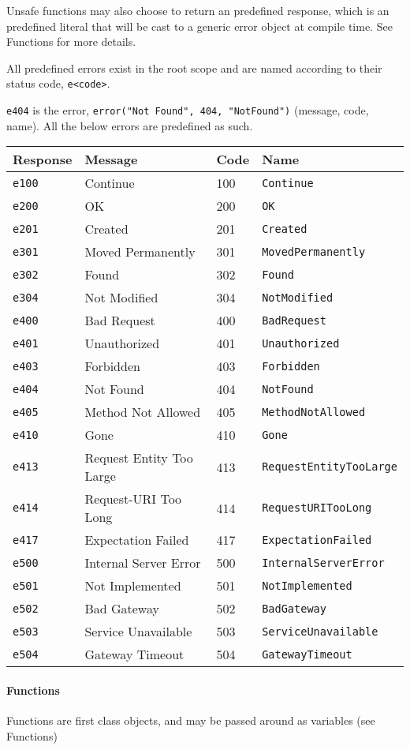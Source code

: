 Unsafe functions may also choose to return an predefined response, which
is an predefined literal that will be cast to a generic error object at
compile time. See Functions for more details.

All predefined errors exist in the root scope and are named according to
their status code, \texttt{e\textless{}code\textgreater{}}.

\texttt{e404} is the error, \texttt{error("Not Found", 404, "NotFound")}
(message, code, name). All the below errors are predefined as such.

\begin{longtable}[c]{@{}llll@{}}
\toprule
Response & Message & Code & Name\tabularnewline
\midrule
\endhead
\texttt{e100} & Continue & 100 & \texttt{Continue}\tabularnewline
\texttt{e200} & OK & 200 & \texttt{OK}\tabularnewline
\texttt{e201} & Created & 201 & \texttt{Created}\tabularnewline
\texttt{e301} & Moved Permanently & 301 &
\texttt{MovedPermanently}\tabularnewline
\texttt{e302} & Found & 302 & \texttt{Found}\tabularnewline
\texttt{e304} & Not Modified & 304 & \texttt{NotModified}\tabularnewline
\texttt{e400} & Bad Request & 400 & \texttt{BadRequest}\tabularnewline
\texttt{e401} & Unauthorized & 401 &
\texttt{Unauthorized}\tabularnewline
\texttt{e403} & Forbidden & 403 & \texttt{Forbidden}\tabularnewline
\texttt{e404} & Not Found & 404 & \texttt{NotFound}\tabularnewline
\texttt{e405} & Method Not Allowed & 405 &
\texttt{MethodNotAllowed}\tabularnewline
\texttt{e410} & Gone & 410 & \texttt{Gone}\tabularnewline
\texttt{e413} & Request Entity Too Large & 413 &
\texttt{RequestEntityTooLarge}\tabularnewline
\texttt{e414} & Request-URI Too Long & 414 &
\texttt{RequestURITooLong}\tabularnewline
\texttt{e417} & Expectation Failed & 417 &
\texttt{ExpectationFailed}\tabularnewline
\texttt{e500} & Internal Server Error & 500 &
\texttt{InternalServerError}\tabularnewline
\texttt{e501} & Not Implemented & 501 &
\texttt{NotImplemented}\tabularnewline
\texttt{e502} & Bad Gateway & 502 & \texttt{BadGateway}\tabularnewline
\texttt{e503} & Service Unavailable & 503 &
\texttt{ServiceUnavailable}\tabularnewline
\texttt{e504} & Gateway Timeout & 504 &
\texttt{GatewayTimeout}\tabularnewline
\bottomrule
\end{longtable}

\paragraph{Functions}\label{functions}

Functions are first class objects, and may be passed around as variables
(see Functions)

